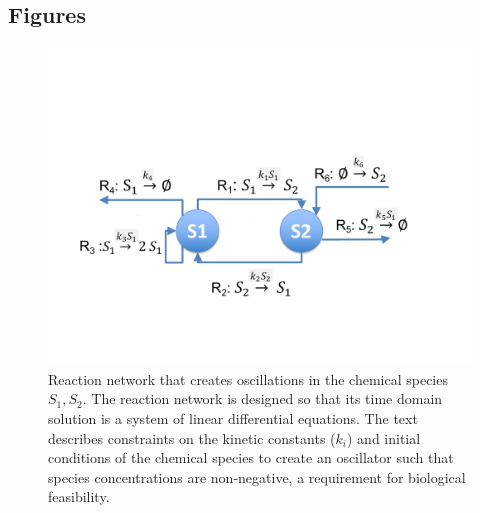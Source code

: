 \documentclass{bmcart}
\begin{document}
\begin{backmatter}



\newpage
\section*{Figures}
\newpage

\begin{figure}
        \centering
         \includegraphics[scale=0.5]{figures/Fig1.pdf}
         \caption[]{Reaction network that creates oscillations in the chemical species $S_1, S_2$. The reaction network is designed so that its time domain solution is a system of linear differential equations. The text describes constraints on the kinetic constants ($k_i$) and initial conditions of the chemical species to create an oscillator such that species concentrations are non-negative, a requirement for biological feasibility.} 
         \label{fig:reaction-network}
\end{figure}


\end{backmatter}
\end{document}
